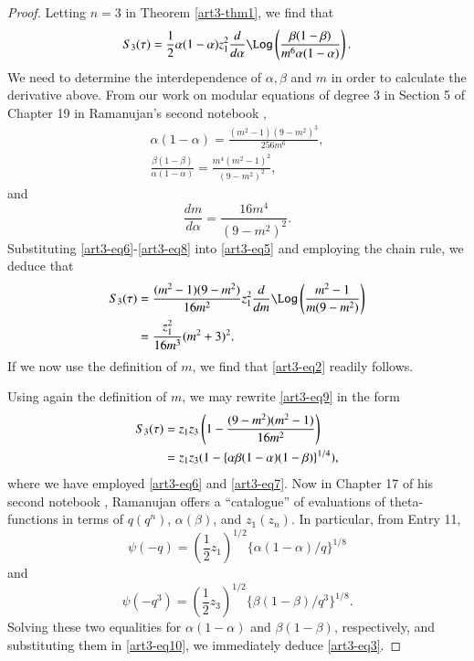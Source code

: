 \begin{proof}
Letting $n=3$ in Theorem \ref{art3-thm1}, we find that
\begin{equation}
S_3 (\tau) = \frac{1}{2} \alpha (1-\alpha) z^2_1 \frac{d}{d\alpha} \Log \left(\frac{\beta(1-\beta)}{m^6 \alpha (1-\alpha)} \right).
\label{art3-eq5}
\end{equation}
We need to determine the interdependence of $\alpha, \beta$ and $m$ in order to calculate the derivative above. From our work \cite{art3-key2} on modular equations of degree 3 in Section 5 of Chapter 19 in Ramanujan's second notebook \cite{art3-key9},
\begin{gather}
\alpha (1-\alpha) = \frac{(m^2 -1)(9-m^2)^3}{256m^6},\label{art3-eq6}\\
\frac{\beta(1-\beta)}{\alpha (1-\alpha)} = \frac{m^4 (m^2-1)^2}{(9-m^2)^2},\label{art3-eq7}
\end{gather}\pageoriginale
and 
\begin{equation}
\frac{dm}{d\alpha} = \frac{16m^4}{(9-m^2)^2} .\label{art3-eq8}
\end{equation}
Substituting \eqref{art3-eq6}-\eqref{art3-eq8} into \eqref{art3-eq5} and employing the chain rule, we deduce that 
\begin{align}
S_3 (\tau) & = \frac{(m^2-1) (9-m^2)}{16m^2} z^2_1 \frac{d}{dm} \Log \left(\frac{m^2 -1}{m(9-m^2)} \right)\label{art3-eq9}\\
& = \frac{z^2_1}{16m^3} (m^2+3)^2. \notag
\end{align}
If we now use the definition of $m$, we find that \eqref{art3-eq2} readily follows.

Using again the definition of $m$, we may rewrite \eqref{art3-eq9} in the form
\begin{align}
S_3 (\tau) & = z_1 z_3 \left(1- \frac{(9-m^2) (m^2-1)}{16m^2} \right) \label{art3-eq10}\\
& = z_1 z_3 (1-\{\alpha \beta (1-\alpha) (1-\beta)\}^{1/4}), \notag
\end{align}
where we have employed \eqref{art3-eq6} and \eqref{art3-eq7}. Now in Chapter 17 of his second notebook \cite{art3-key9}, Ramanujan offers a ``catalogue'' of evaluations of theta-functions in terms of $q(q^n)$, $\alpha (\beta)$, and $z_1 (z_n)$. In particular, from Entry 11, 
$$
\psi (-q)  = (\frac{1}{2} z_1)^{1/2} \{\alpha (1-\alpha) / q\}^{1/8}
$$
and 
$$
\psi (-q^3) = (\frac{1}{2}z_3)^{1/2} \{\beta (1-\beta) /q^3\}^{1/8}.
$$
Solving these two equalities for $\alpha (1-\alpha)$ and $\beta (1-\beta)$, respectively, and substituting them in \eqref{art3-eq10}, we immediately deduce \eqref{art3-eq3}.


\end{proof}
